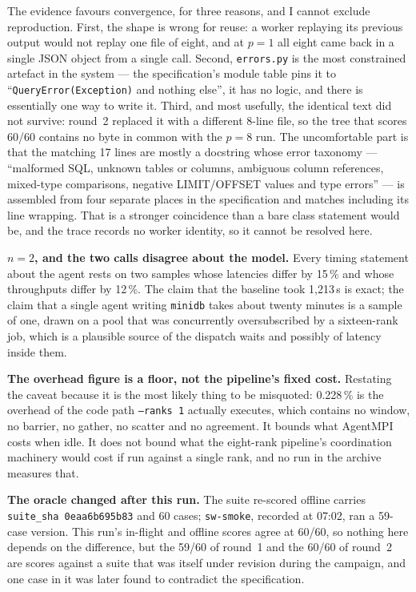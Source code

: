 \documentclass[11pt]{article}
\begin{document}
The evidence favours convergence, for three reasons, and I cannot exclude reproduction. First,
the shape is wrong for reuse: a worker replaying its previous output would not replay one file
of eight, and at $p=1$ all eight came back in a single JSON object from a single call. Second,
\texttt{errors.py} is the most constrained artefact in the system --- the specification's
module table pins it to ``\texttt{QueryError(Exception)} and nothing else'', it has no logic,
and there is essentially one way to write it. Third, and most usefully, the identical text did
not survive: round~2 replaced it with a different 8-line file, so the tree that scores 60/60
contains no byte in common with the $p=8$ run. The uncomfortable part is that the matching 17
lines are mostly a docstring whose error taxonomy --- ``malformed SQL, unknown tables or
columns, ambiguous column references, mixed-type comparisons, negative LIMIT/OFFSET values and
type errors'' --- is assembled from four separate places in the specification and matches
including its line wrapping. That is a stronger coincidence than a bare class statement would
be, and the trace records no worker identity, so it cannot be resolved here.

\textbf{$n = 2$, and the two calls disagree about the model.} Every timing statement about the
agent rests on two samples whose latencies differ by 15\,\% and whose throughputs differ by
12\,\%. The claim that the baseline took 1{,}213\,s is exact; the claim that a single agent
writing \texttt{minidb} takes about twenty minutes is a sample of one, drawn on a pool that was
concurrently oversubscribed by a sixteen-rank job, which is a plausible source of the dispatch
waits and possibly of latency inside them.

\textbf{The overhead figure is a floor, not the pipeline's fixed cost.} Restating the caveat
because it is the most likely thing to be misquoted: 0.228\,\% is the overhead of the code path
\texttt{--ranks 1} actually executes, which contains no window, no barrier, no gather, no
scatter and no agreement. It bounds what AgentMPI costs when idle. It does not bound what the
eight-rank pipeline's coordination machinery would cost if run against a single rank, and no
run in the archive measures that.

\textbf{The oracle changed after this run.} The suite re-scored offline carries
\texttt{suite\_sha 0eaa6b695b83} and 60 cases; \texttt{sw-smoke}, recorded at 07:02, ran a
59-case version. This run's in-flight and offline scores agree at 60/60, so nothing here
depends on the difference, but the 59/60 of round~1 and the 60/60 of round~2 are scores against
a suite that was itself under revision during the campaign, and one case in it was later found
to contradict the specification.
\end{document}
